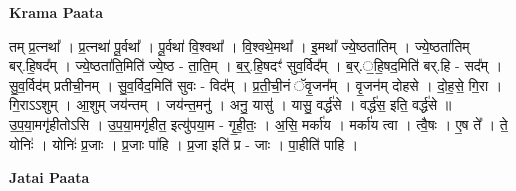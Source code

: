 \documentclass[17pt]{extarticle}
\begin{document}
\textbf{Krama Paata} \newline

तम् प्र॒त्नथा᳚ । प्र॒त्नथा॑ पू॒र्वथा᳚ । पू॒र्वथा॑ वि॒श्वथा᳚ । वि॒श्वथे॒मथा᳚ । इ॒मथा᳚ ज्ये॒ष्ठता॑तिम् । ज्ये॒ष्ठता॑तिम् बर्.हि॒षद᳚म् । ज्ये॒ष्ठता॑ति॒मिति॑ ज्ये॒ष्ठ - ता॒ति॒म् । ब॒र्॒.हि॒षदꣳ॑ सुव॒र्विद᳚म् । ब॒र्.॒हि॒षद॒मिति॑ बर्.हि - सद᳚म् । सु॒व॒र्विद॑म् प्रतीची॒नम् । सु॒व॒र्विद॒मिति॑ सुवः - विद᳚म् । प्र॒ती॒ची॒नं ॅवृ॒जन᳚म् । वृ॒जन॑म् दोहसे । दो॒ह॒से॒ गि॒रा । गि॒राऽऽशुम् । आ॒शुम् जय॑न्तम् । जय॑न्त॒मनु॑ । अनु॒ यासु॑ । यासु॒ वर्द्ध॑से । वर्द्ध॑स॒ इति॒ वर्द्ध॑से ॥ उ॒प॒या॒मगृ॑हीतोऽसि । उ॒प॒या॒मगृ॑हीत॒ इत्यु॑पया॒म - गृ॒ही॒तः॒ । अ॒सि॒ मर्का॑य । मर्का॑य त्वा । त्वै॒षः । ए॒ष ते᳚ । ते॒ योनिः॑ । योनिः॑ प्र॒जाः । प्र॒जाः पा॑हि । प्र॒जा इति॑ प्र - जाः । पा॒हीति॑ पाहि । \newline

\textbf{Jatai Paata} \newline
\end{document}
